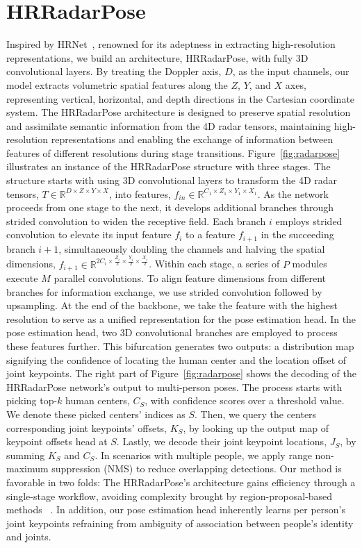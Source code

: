 \section{HRRadarPose}
Inspired by HRNet~\cite{hrnet}, renowned for its adeptness in extracting high-resolution representations, we build an architecture, HRRadarPose, with fully 3D convolutional layers.
By treating the Doppler axis, \(D\), as the input channels, our model extracts volumetric spatial features along the \(Z\), \(Y\), and \(X\) axes, representing vertical, horizontal, and depth directions in the Cartesian coordinate system. 
The HRRadarPose architecture is designed to preserve spatial resolution and assimilate semantic information from the 4D radar tensors, maintaining high-resolution representations and enabling the exchange of information between features of different resolutions during stage transitions.
Figure~\ref{fig:radarpose} illustrates an instance of the HRRadarPose structure with three stages. 
The structure starts with using 3D convolutional layers to transform the 4D radar tensors, \(T \in \mathbb{R}^{D \times Z \times Y \times X}\), into features, \(f_{in} \in \mathbb{R}^{C_{1} \times Z_{1} \times Y_{1} \times X_{1}}\). 
As the network proceeds from one stage to the next, it develops additional branches through strided convolution to widen the receptive field. 
Each branch \(i\) employs strided convolution to elevate its input feature \(f_{i}\) to a feature \(f_{i+1}\) in the succeeding branch \(i+1\), simultaneously doubling the channels and halving the spatial dimensions, \(f_{i+1} \in \mathbb{R}^{ 2C_{i} \times \frac{Z_{i}}{2} \times \frac{Y_{i}}{2} \times \frac{X_{i}}{2} }\).
Within each stage, a series of \(P\) modules execute \(M\) parallel convolutions. 
To align feature dimensions from different branches for information exchange, we use strided convolution followed by upsampling. 
At the end of the backbone, we take the feature with the highest resolution to serve as a unified representation for the pose estimation head. 
In the pose estimation head, two 3D convolutional branches are employed to process these features further. 
This bifurcation generates two outputs: a distribution map signifying the confidence of locating the human center and the location offset of joint keypoints. 
The right part of Figure~\ref{fig:radarpose} shows the decoding of the HRRadarPose network's output to multi-person poses.
The process starts with picking top-$k$ human centers, \(C_S\), with confidence scores over a threshold value. 
We denote these picked centers' indices as \(S\).
Then, we query the centers corresponding joint keypoints' offsets, \(K_S\), by looking up the output map of keypoint offsets head at \(S\). 
Lastly, we decode their joint keypoint locations, \(J_S\), by summing \(K_S\) and \(C_S\). 
In scenarios with multiple people, we apply range non-maximum suppression (NMS) to reduce overlapping detections. Our method is favorable in two folds:
The HRRadarPose's architecture gains efficiency through a single-stage workflow, avoiding complexity brought by region-proposal-based methods ~\cite{zhao2018rf}. In addition, our pose estimation head inherently learns per person's joint keypoints refraining from ambiguity of association between people's identity and joints. 

